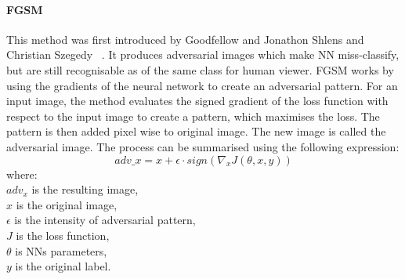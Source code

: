 \paragraph{FGSM}

This method was first introduced by Goodfellow and Jonathon Shlens and Christian Szegedy
~\cite{goodfellow2015explaining}.
It produces adversarial images which make NN miss-classify,
but are still recognisable as of the same class for human viewer.
FGSM works by using the gradients of the neural network to create an adversarial pattern.
For an input image,
the method evaluates the signed gradient of the loss function with respect to the input image to create a pattern,
which maximises the loss.
The pattern is then added pixel wise to original image.
The new image is called the adversarial image.
The process can be summarised using the following expression:
\begin{equation}
    adv\_x = x + \epsilon \cdot sign(\nabla_x J(\theta, x, y))
\end{equation}
where: \\
$adv_x$ is the resulting image, \\
$x$ is the original image, \\
$\epsilon$ is the intensity of adversarial pattern, \\
$J$ is the loss function, \\
$\theta$ is NNs parameters, \\
$y$ is the original label.
\\

